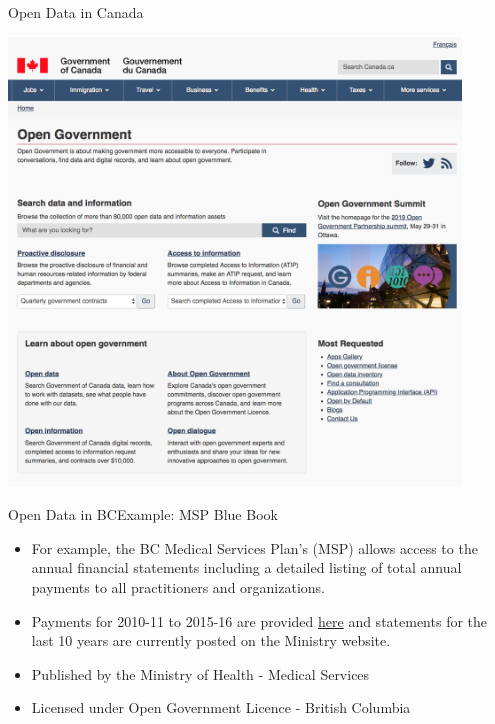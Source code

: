 \documentclass[xcolor=svgnames]{beamer}
\newcommand{\nl}{\\[1em]}
\begin{document}
\begin{frame}{Open Data in Canada}
\begin{center}
\includegraphics[width=0.9\textwidth]{img/gov}
\end{center}
\end{frame}

\begin{frame}{Open Data in BC}{Example: MSP Blue Book}
\begin{itemize}
\item For example, the BC Medical Services Plan's (MSP) allows access to the annual financial statements including a detailed listing of total annual payments to all practitioners and organizations. \nl
\item Payments for 2010-11 to 2015-16 are provided \href{https://catalogue.data.gov.bc.ca/dataset/msp-blue-book}{here} and statements for the last 10 years are currently posted on the Ministry website.\nl
\item Published by the Ministry of Health - Medical Services 
\item Licensed under Open Government Licence - British Columbia
\end{itemize}
\end{frame}
\end{document}
